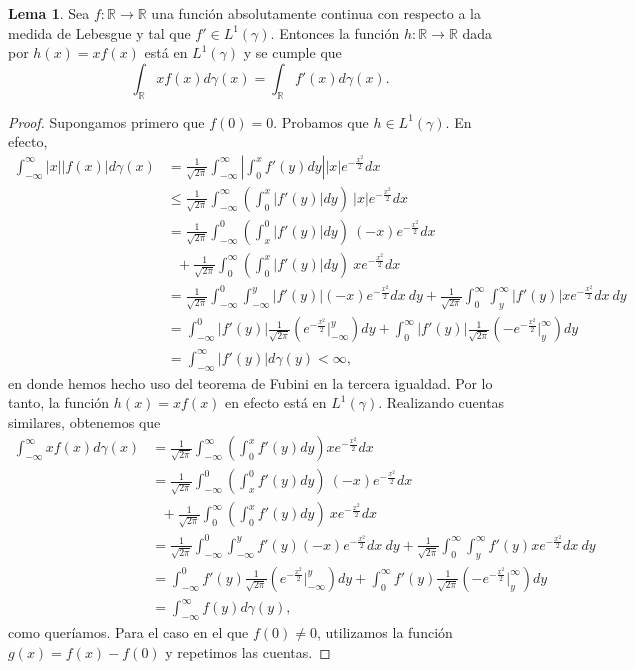 \documentclass[letterpaper,twoside,12pt]{book}
\newcommand{\R}{\mathbb{R}}
\newcommand{\1}{\mathds{1}}
\newcommand{\abs}[1]{\left\lvert #1 \right\rvert}
\renewcommand{\to}{\rightarrow}
\theoremstyle{definition}
\theoremstyle{definition}
\theoremstyle{remark}
\theoremstyle{definition}
\theoremstyle{definition}
\theoremstyle{definition}
\theoremstyle{definition}
\theoremstyle{definition}
\newtheorem{lema}{Lema}
\begin{document}
\begin{lema}\label{lema1}
Sea $f:\R\to\R$ una función absolutamente continua con respecto a la medida de Lebesgue y tal que $f'\in L^{1}(\gamma)$. Entonces la función $h:\R\to\R$ dada por $h(x)=xf(x)$ está en $L^1(\gamma)$ y se cumple que 
\[
\int_\R xf(x)d\gamma(x)=\int_\R f'(x)d\gamma(x).
\]
\end{lema}
\begin{proof} 
  Supongamos primero que $f(0)=0$. Probamos que $h\in L^{1}(\gamma)$. En efecto,  
  \begin{align*}
   \int_{-\infty}^{\infty}|x||f(x)|d\gamma(x)&=\frac{1}{\sqrt{2\pi}}\int_{-\infty}^\infty\abs{\int_0^{x}f'(y)dy}|x|e^{-\frac{x^2}{2}}dx\\
   &\leq \frac{1}{\sqrt{2\pi}}\int_{-\infty}^\infty \left(\int_0^{x}\abs{f'(y)}dy\right) \ |x|e^{-\frac{x^2}{2}}dx\\
   &=\frac{1}{\sqrt{2\pi}}\int_{-\infty}^0 \left(\int_x^{0}\abs{f'(y)}dy\right) \ (-x)e^{-\frac{x^2}{2}}dx\\
   & \ \ \  +\frac{1}{\sqrt{2\pi}}\int_{0}^\infty \left(\int_0^{x}\abs{f'(y)}dy\right) \ xe^{-\frac{x^2}{2}}dx\\
   &=\frac{1}{\sqrt{2\pi}}\int_{-\infty}^0 \int_{-\infty}^{y}\abs{f'(y)}(-x)e^{-\frac{x^2}{2}}dx \ dy+\frac{1}{\sqrt{2\pi}} \int_{0}^{\infty}\int_{y}^\infty \abs{f'(y)}xe^{-\frac{x^2}{2}}dx \ dy\\
   &=\int_{-\infty}^0 \abs{f'(y)}\frac{1}{\sqrt{2\pi}}\left(e^{-\frac{x^2}{2}}\Big|_{-\infty}^{y}\right) dy + \int_{0}^{\infty}\abs{f'(y)}\frac{1}{\sqrt{2\pi}}\left(-e^{-\frac{x^2}{2}}\Big|_{y}^{\infty}\right)dy\\
   &=\int_{-\infty}^{\infty}|f'(y)|d\gamma(y)<\infty,
  \end{align*}
  en donde hemos hecho uso del teorema de Fubini en la tercera igualdad. Por lo tanto, la función $h(x)=xf(x)$ en efecto está en $L^1(\gamma)$. Realizando cuentas similares, obtenemos que 
  \begin{align*}
   \int_{-\infty}^{\infty}xf(x)d\gamma(x)&=\frac{1}{\sqrt{2\pi}}\int_{-\infty}^\infty \left(\int_0^{x}f'(y)dy\right) xe^{-\frac{x^2}{2}}dx\\
   &=\frac{1}{\sqrt{2\pi}}\int_{-\infty}^0 \left(\int_x^{0}f'(y)dy\right) \ (-x)e^{-\frac{x^2}{2}}dx\\
   & \ \ \  +\frac{1}{\sqrt{2\pi}}\int_{0}^\infty \left(\int_0^{x}f'(y) dy\right) \ xe^{-\frac{x^2}{2}}dx\\
   &=\frac{1}{\sqrt{2\pi}}\int_{-\infty}^0 \int_{-\infty}^{y}f'(y)(-x)e^{-\frac{x^2}{2}}dx\ dy+\frac{1}{\sqrt{2\pi}} \int_{0}^{\infty}\int_{y}^\infty f'(y)xe^{-\frac{x^2}{2}}dx\ dy\\
   &=\int_{-\infty}^0 f'(y)\frac{1}{\sqrt{2\pi}}\left(e^{-\frac{x^2}{2}}\Big|_{-\infty}^{y}\right) dy + \int_{0}^{\infty}f'(y)\frac{1}{\sqrt{2\pi}}\left(-e^{-\frac{x^2}{2}}\Big|_{y}^{\infty}\right)dy\\
   &=\int_{-\infty}^{\infty}f(y)d\gamma(y),
  \end{align*}
  como queríamos. Para el caso en el que $f(0)\neq 0$, utilizamos la función $g(x)=f(x)-f(0)$ y repetimos las cuentas.
\end{proof}
\end{document}
